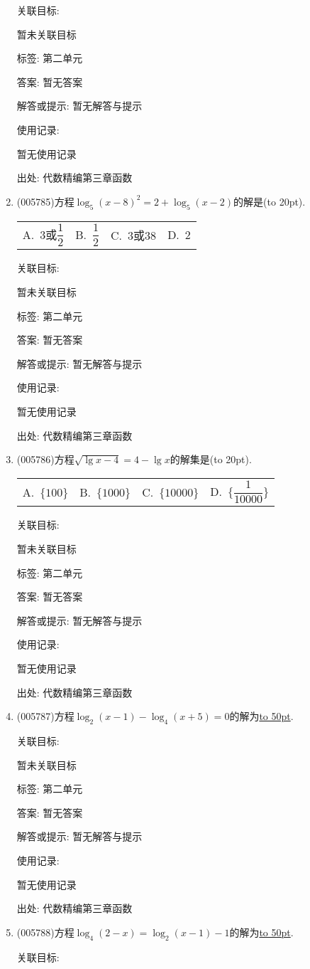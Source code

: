 \documentclass[10pt,a4paper]{article}
\newcommand{\blank}[1]{\underline{\hbox to #1pt{}}}
\newcommand{\bracket}[1]{(\hbox to #1pt{})}
\newcommand{\fourch}[4]{\par\begin{tabular}{p{.23\textwidth}p{.23\textwidth}p{.23\textwidth}p{.23\textwidth}}
A.~#1 &B.~#2& C.~#3& D.~#4
\end{tabular}}
\begin{document}
\begin{enumerate}[1.]
关联目标:

暂未关联目标



标签: 第二单元

答案: 暂无答案

解答或提示: 暂无解答与提示

使用记录:

暂无使用记录


出处: 代数精编第三章函数
\item { (005785)}方程$\log_5(x-8)^2=2+\log_5(x-2)$的解是\bracket{20}.
\fourch{3或$\dfrac 12$}{$\dfrac 12$}{$3$或$38$}{$2$}


关联目标:

暂未关联目标



标签: 第二单元

答案: 暂无答案

解答或提示: 暂无解答与提示

使用记录:

暂无使用记录


出处: 代数精编第三章函数
\item { (005786)}方程$\sqrt {\lg x-4}=4-\lg x$的解集是\bracket{20}.
\fourch{$\{100\}$}{$\{1000\}$}{$\{10000\}$}{$\{\dfrac 1{10000}\}$}


关联目标:

暂未关联目标



标签: 第二单元

答案: 暂无答案

解答或提示: 暂无解答与提示

使用记录:

暂无使用记录


出处: 代数精编第三章函数
\item { (005787)}方程$\log_2(x-1)-\log_4(x+5)=0$的解为\blank{50}.


关联目标:

暂未关联目标



标签: 第二单元

答案: 暂无答案

解答或提示: 暂无解答与提示

使用记录:

暂无使用记录


出处: 代数精编第三章函数
\item { (005788)}方程$\log_4(2-x)=\log_2(x-1)-1$的解为\blank{50}.


关联目标:


\end{enumerate}
\end{document}
